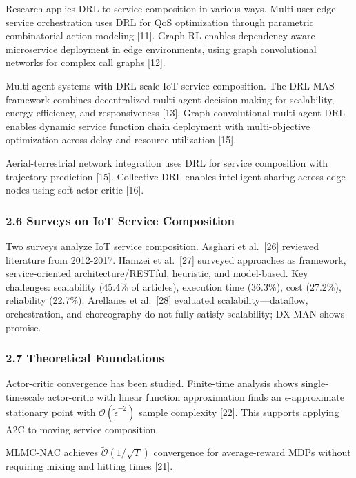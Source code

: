 \documentclass[
  10pt,
  twocolumn,
]{article}
\begin{document}
Research applies DRL to service composition in various ways. Multi-user
edge service orchestration uses DRL for QoS optimization through
parametric combinatorial action modeling {[}11{]}. Graph RL enables
dependency-aware microservice deployment in edge environments, using
graph convolutional networks for complex call graphs {[}12{]}.

Multi-agent systems with DRL scale IoT service composition. The DRL-MAS
framework combines decentralized multi-agent decision-making for
scalability, energy efficiency, and responsiveness {[}13{]}. Graph
convolutional multi-agent DRL enables dynamic service function chain
deployment with multi-objective optimization across delay and resource
utilization {[}15{]}.

Aerial-terrestrial network integration uses DRL for service composition
with trajectory prediction {[}15{]}. Collective DRL enables intelligent
sharing across edge nodes using soft actor-critic {[}16{]}.

\hypertarget{surveys-on-iot-service-composition}{%
	\subsubsection{2.6 Surveys on IoT Service
		Composition}\label{surveys-on-iot-service-composition}}

Two surveys analyze IoT service composition. Asghari et al.~{[}26{]}
reviewed literature from 2012-2017. Hamzei et al.~{[}27{]} surveyed
approaches as framework, service-oriented architecture/RESTful,
heuristic, and model-based. Key challenges: scalability (45.4\% of
articles), execution time (36.3\%), cost (27.2\%), reliability (22.7\%).
Arellanes et al.~{[}28{]} evaluated scalability---dataflow,
orchestration, and choreography do not fully satisfy scalability; DX-MAN
shows promise.

\hypertarget{theoretical-foundations}{%
	\subsubsection{2.7 Theoretical
		Foundations}\label{theoretical-foundations}}

Actor-critic convergence has been studied. Finite-time analysis shows
single-timescale actor-critic with linear function approximation finds
an \(\epsilon\)-approximate stationary point with
\(\mathcal{O}(\tilde{\epsilon}^{-2})\) sample complexity {[}22{]}. This
supports applying A2C to moving service composition.

MLMC-NAC achieves \(\tilde{\mathcal{O}}(1/\sqrt{T})\) convergence for
average-reward MDPs without requiring mixing and hitting times {[}21{]}.
\end{document}
